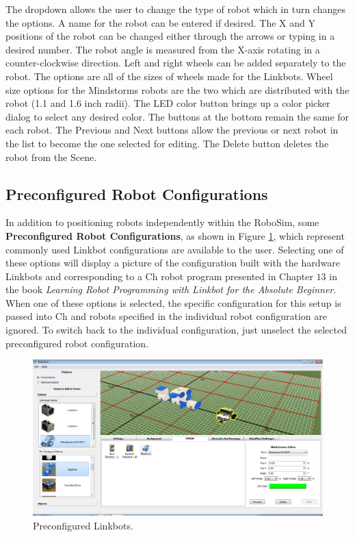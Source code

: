 \documentclass{article}
\begin{document}
The dropdown allows the user to change the type of robot which in turn changes
the options.  A name for the robot can be entered if desired.  The X and Y
positions of the robot can be changed either through the arrows or typing in a
desired number.  The robot angle is measured from the X-axis rotating in a
counter-clockwise direction.  Left and right wheels can be added separately to
the robot.  The options are all of the sizes of wheels made for the Linkbots.
Wheel size options for the Mindstorms robots are the two which are distributed
with the robot (1.1 and 1.6 inch radii).  The LED color button brings up a color
picker dialog to select any desired color.  The buttons at the bottom remain the
same for each robot.  The Previous and Next buttons allow the previous or next
robot in the list to become the one selected for editing.  The Delete button
deletes the robot from the Scene.

\subsection{Preconfigured Robot Configurations}
In addition to positioning robots independently within the RoboSim, some {\bf
Preconfigured Robot Configurations}, as shown in Figure \ref{fig:preconfig},
which represent commonly used Linkbot configurations  are available to the user.
Selecting one of these options will display a picture of the configuration built
with the hardware Linkbots and corresponding to a Ch robot program presented in
Chapter $13$ in the book {\em Learning Robot Programming with Linkbot for the
Absolute Beginner}.  When one of these options is selected, the specific
configuration for this setup is passed into Ch and robots specified in the
individual robot configuration are ignored.  To switch back to the individual
configuration, just unselect the selected preconfigured robot configuration.
\begin{figure}[H]
	\begin{center}
		\includegraphics[width=6in]{pictures/gui_preconfig}
	\end{center}
	\caption{Preconfigured Linkbots.}
	\label{fig:preconfig}
\end{figure}
\end{document}
